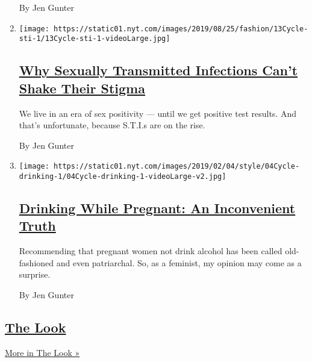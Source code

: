 \begin{enumerate}
  By Jen Gunter
\item
  \texttt{[image: https://static01.nyt.com/images/2019/08/25/fashion/13Cycle-sti-1/13Cycle-sti-1-videoLarge.jpg]}

  \hypertarget{why-sexually-transmitted-infections-cant-shake-their-stigma}{%
  \subsection{\texorpdfstring{\href{/2019/08/13/style/sti-stigma-sexual-transmitted-infections.html}{Why
  Sexually Transmitted Infections Can't Shake Their
  Stigma}}{Why Sexually Transmitted Infections Can't Shake Their Stigma}}\label{why-sexually-transmitted-infections-cant-shake-their-stigma}}

  We live in an era of sex positivity --- until we get positive test
  results. And that's unfortunate, because S.T.I.s are on the rise.

  By Jen Gunter
\item
  \texttt{[image: https://static01.nyt.com/images/2019/02/04/style/04Cycle-drinking-1/04Cycle-drinking-1-videoLarge-v2.jpg]}

  \hypertarget{drinking-while-pregnant-an-inconvenient-truth}{%
  \subsection{\texorpdfstring{\href{/2019/02/05/style/drinking-while-pregnant.html}{Drinking
  While Pregnant: An Inconvenient
  Truth}}{Drinking While Pregnant: An Inconvenient Truth}}\label{drinking-while-pregnant-an-inconvenient-truth}}

  Recommending that pregnant women not drink alcohol has been called
  old-fashioned and even patriarchal. So, as a feminist, my opinion may
  come as a surprise.

  By Jen Gunter
\end{enumerate}

\hypertarget{the-look}{%
\subsection{\texorpdfstring{\href{/column/the-look}{The
Look}}{The Look}}\label{the-look}}

\href{/column/the-look}{More in The Look »}

